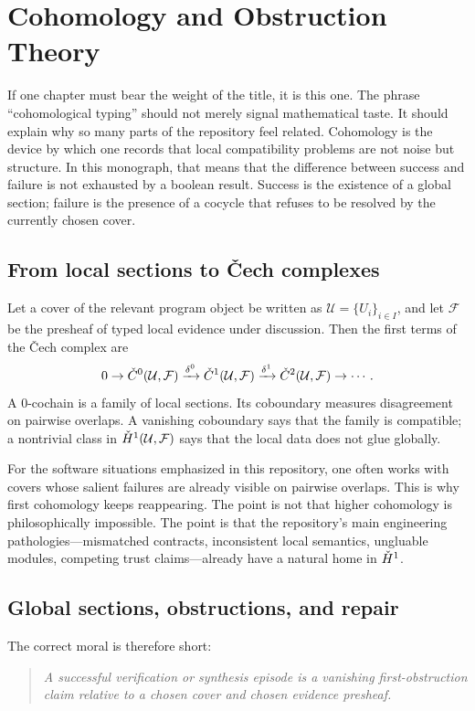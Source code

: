 \chapter{Cohomology and Obstruction Theory}

If one chapter must bear the weight of the title, it is this one. The phrase
``cohomological typing'' should not merely signal mathematical taste. It should explain why
so many parts of the repository feel related. Cohomology is the device by which one records
that local compatibility problems are not noise but structure. In this monograph, that means
that the difference between success and failure is not exhausted by a boolean result. Success
is the existence of a global section; failure is the presence of a cocycle that refuses to be
resolved by the currently chosen cover.

\section*{From local sections to Čech complexes}
Let a cover of the relevant program object be written as \(\mathcal{U} = \{U_i\}_{i \in I}\),
and let \(\mathcal{F}\) be the presheaf of typed local evidence under discussion. Then the
first terms of the Čech complex are
\[
0 \to \check{C}^0(\mathcal{U}, \mathcal{F}) \xrightarrow{\delta^0}
\check{C}^1(\mathcal{U}, \mathcal{F}) \xrightarrow{\delta^1}
\check{C}^2(\mathcal{U}, \mathcal{F}) \to \cdots.
\]
A $0$-cochain is a family of local sections. Its coboundary measures disagreement on pairwise
overlaps. A vanishing coboundary says that the family is compatible; a nontrivial class in
\(\check{H}^{1}(\mathcal{U},\mathcal{F})\) says that the local data does not glue globally.

For the software situations emphasized in this repository, one often works with covers whose
salient failures are already visible on pairwise overlaps. This is why first cohomology keeps
reappearing. The point is not that higher cohomology is philosophically impossible. The point
is that the repository's main engineering pathologies---mismatched contracts, inconsistent
local semantics, ungluable modules, competing trust claims---already have a natural home in
\(\check{H}^{1}\).

\section*{Global sections, obstructions, and repair}
The correct moral is therefore short:
\begin{quote}
\emph{A successful verification or synthesis episode is a vanishing first-obstruction claim
relative to a chosen cover and chosen evidence presheaf.}
\end{quote}

